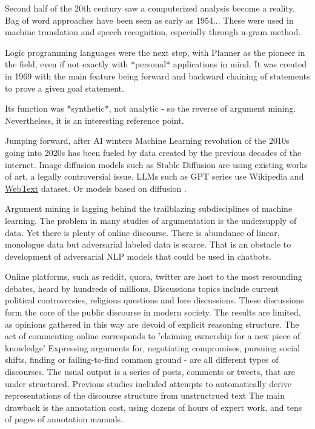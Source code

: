 \documentclass{report}
\begin{document}
Second half of the 20th century saw a computerized analysis become a reality. Bag of word approaches have been seen as early as 1954... \cite{harris_distributional_1954}
These were used in machine translation and speech recognition, especially through n-gram method. \cite{r_costa-jussa_analysis_2007}

Logic programming languages were the next step, with Planner \cite{hewitt_planner_1970} as the pioneer in the field, even if not exactly with *personal* applications in mind.  It was created in 1969 with the main feature being forward and backward chaining of statements to prove a given goal statement.

Its function was *synthetic*, not analytic - so the reverse of argument mining. Nevertheless, it is an interesting reference point.

Jumping forward, after AI winters Machine Learning revolution of the 2010s going into 2020s has been fueled by data created by the previous decades of the internet. Image diffusion models such as Stable Diffusion are using existing works of art, a legally controversial issue. LLMs such as GPT series use Wikipedia and \href{https:\\paperswithcode.com/dataset/webtext}{WebText} dataset.
Or models based on diffusion \cite{rombach_high-resolution_2022}.

Argument mining is lagging behind the trailblazing subdisciplines of machine learning. The problem in many studies of argumentation is the undersupply of data. Yet there is plenty of online discourse.
There is abundance of linear, monologue data but adversarial labeled data is scarce. That is an obstacle to development of adversarial NLP models that could be used in chatbots. 

Online platforms, such as reddit, quora, twitter are host to the most resounding debates, heard by hundreds of millions.  Discussions topics include current political controversies, religious questions and lore discussions. These discussions form the core of the public discourse in modern society.  The results are limited, as opinions gathered in this way are devoid of explicit reasoning structure.  The act of commenting online corresponds to 'claiming ownership for a new piece of knowledge' \cite{teufel_scientific_2014} Expressing arguments for, negotiating compromises, pursuing social shifts, finding or failing-to-find common ground - are all different types of discourses. The usual output is a series of posts, comments or tweets, that are under structured. 
Previous studies included attempts to automatically derive representations of the discourse structure from unstructrued text \cite{abbott_how_2011}
The main drawback is the annotation cost, using dozens of hours of expert work, and tens of pages of annotation manuals.
\end{document}
